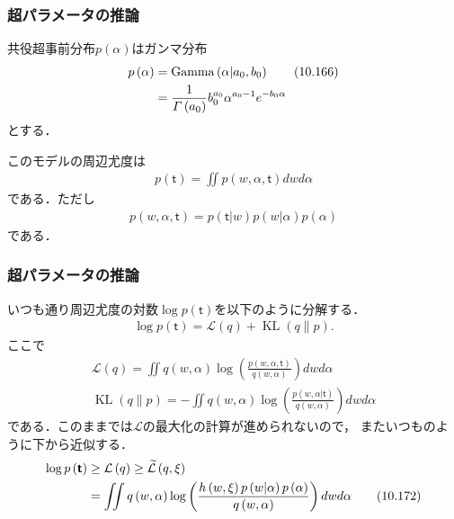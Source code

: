 \documentclass[10pt,usepdftitle=false,hyperref={unicode}]{beamer}
\DeclareMathOperator*{\KL}{KL}
\DeclareMathOperator*{\GammaDistribution}{Gamma}
\newcommand{\parentheses}[1]{\left(#1\right)}
\newcommand{\energy}{\mathcal{L}}
\begin{document}
\begin{frame}
\frametitle{超パラメータの推論}
共役超事前分布$p\parentheses{\alpha}$はガンマ分布
\begin{align}
    p\parentheses{\alpha}
    &= \GammaDistribution\parentheses{\alpha|a_0,b_0} \tag{10.166} \label{palpha} \\
    &= \frac{1}{\varGamma\parentheses{a_0}}b_0^{a_0}\alpha^{a_0 - 1}e^{-b_0\alpha} \notag
\end{align}
とする．

\bigskip

このモデルの周辺尤度は
\begin{align}
    p\parentheses{\bm{\mathsf{t}}} = \iint p\parentheses{w,\alpha,\bm{\mathsf{t}}}dwd\alpha \tag{10.167}
\end{align}
である．ただし
\begin{align}
    p\parentheses{w,\alpha,\bm{\mathsf{t}}} = p\parentheses{\bm{\mathsf{t}}|w}p\parentheses{w|\alpha}p\parentheses{\alpha} \tag{10.168}
\end{align}
である．
\end{frame}

\begin{frame}
\frametitle{超パラメータの推論}
いつも通り周辺尤度の対数$\log p\parentheses{\bm{\mathsf{t}}}$を以下のように分解する．
\begin{align*}
    \log p\parentheses{\bm{\mathsf{t}}} = \energy\parentheses{q} + \KL\parentheses{q\|p}. \tag{10.169}
\end{align*}
ここで
\begin{gather}
    \energy\parentheses{q}
    = \iint q\parentheses{w,\alpha}
    \log\parentheses{%
        \frac{p\parentheses{w,\alpha,\bm{\mathsf{t}}}}{q\parentheses{w,\alpha}}
    }
    dwd\alpha \tag{10.170} \\
    \KL\parentheses{q\|p}
    = -\iint q\parentheses{w,\alpha}
    \log\parentheses{%
        \frac{p\parentheses{w,\alpha|\bm{\mathsf{t}}}}{q\parentheses{w,\alpha}}
    }
    dwd\alpha \tag{10.171}
\end{gather}
である．このままでは$\energy$の最大化の計算が進められないので，
またいつものように下から近似する．
\begin{align}
    \log p\parentheses{\bm{\mathsf{t}}}
    &\geq \energy\parentheses{q} \geq \widetilde{\energy}\parentheses{q,\xi} \notag \\
    &= \iint q\parentheses{w,\alpha}\log\parentheses{\frac{h\parentheses{w,\xi}p\parentheses{w|\alpha}p\parentheses{\alpha}}{q\parentheses{w,\alpha}}}dwd\alpha
    \tag{10.172}
\end{align}
\end{frame}
\end{document}
